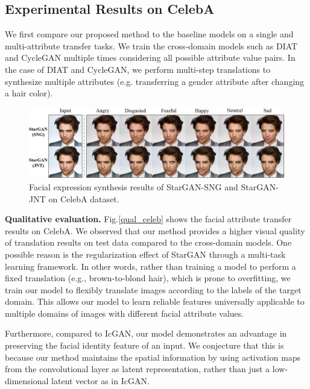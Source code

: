 \documentclass[10pt,twocolumn,letterpaper]{article}
\begin{document}
\subsection{Experimental Results on CelebA}
We first compare our proposed method to the baseline models on a single and multi-attribute transfer tasks. We train the cross-domain models such as DIAT and CycleGAN multiple times considering all possible attribute value pairs. 
In the case of DIAT and CycleGAN, we perform multi-step translations to synthesize multiple attributes (e.g. transferring a gender attribute after changing a hair color).
\medskip

\begin{figure}[t]
\centering
\centerline{\includegraphics[width=1.0\linewidth]{images/figure6.jpg}}
\caption{Facial expression synthesis results of StarGAN-SNG and StarGAN-JNT on CelebA dataset.}
\label{figure6}
\vspace{-0.1in}
\end{figure}

\noindent\textbf{Qualitative evaluation.} Fig.\thinspace\ref{qual_celeb} shows the facial attribute transfer results on CelebA. We observed that our method provides a higher visual quality of translation results on test data compared to the cross-domain models. One possible reason is the regularization effect of StarGAN through a multi-task learning framework. In other words, rather than training a model to perform a fixed translation (e.g., brown-to-blond hair), which is prone to overfitting, we train our model to flexibly translate images according to the labels of the target domain. This allows our model to learn reliable features universally applicable to multiple domains of images with different facial attribute values. 

Furthermore, compared to IcGAN, our model demonstrates an advantage in preserving the facial identity feature of an input. We conjecture that this is because our method maintains the spatial information by using activation maps from the convolutional layer as latent representation, rather than just a low-dimensional latent vector as in IcGAN. 
\end{document}
